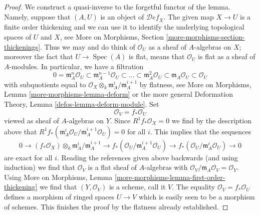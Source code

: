 \documentclass[10pt,a4paper]{amsart}
\theoremstyle{plain}
\theoremstyle{definition}
\theoremstyle{remark}
\numberwithin{equation}{subsection}
\def\Spec{\mathop{\mathrm{Spec}}}
\def\Deformationcategory{\mathcal{D}\!\mathit{ef}}
\begin{document}
\begin{proof}
We construct a quasi-inverse to the forgetful functor of the lemma.
Namely, suppose that $(A, U)$ is an object of $\Deformationcategory_X$.
The given map $X \to U$ is a finite order thickening and we can use
it to identify the underlying topological spaces of $U$ and $X$, see
More on Morphisms, Section \ref{more-morphisms-section-thickenings}.
Thus we may and do think of $\mathcal{O}_U$ as a sheaf of
$A$-algebras on $X$; moreover the fact that $U \to \Spec(A)$ is
flat, means that $\mathcal{O}_U$ is flat as a sheaf of $A$-modules.
In particular, we have a filtration
$$
0 = \mathfrak m_A^n\mathcal{O}_U \subset
\mathfrak m_A^{n - 1}\mathcal{O}_U \subset \ldots \subset
\mathfrak m_A^2\mathcal{O}_U \subset
\mathfrak m_A\mathcal{O}_U \subset \mathcal{O}_U
$$
with subquotients equal to
$\mathcal{O}_X \otimes_k \mathfrak m_A^i/\mathfrak m_A^{i + 1}$
by flatness, see More on Morphisms, Lemma \ref{more-morphisms-lemma-deform}
or the more general Deformation Theory, Lemma \ref{defos-lemma-deform-module}.
Set
$$
\mathcal{O}_V = f_*\mathcal{O}_U
$$
viewed as sheaf of $A$-algebras on $Y$. Since
$R^1f_*\mathcal{O}_X = 0$ we find by the description above that
$R^1f_*(\mathfrak m_A^i\mathcal{O}_U/\mathfrak m_A^{i + 1}\mathcal{O}_U) = 0$
for all $i$. This implies that the sequences
$$
0 \to
(f_*\mathcal{O}_X) \otimes_k \mathfrak m_A^i/\mathfrak m_A^{i + 1} \to
f_*(\mathcal{O}_U/\mathfrak m_A^{i + 1}\mathcal{O}_U) \to
f_*(\mathcal{O}_U/\mathfrak m_A^i\mathcal{O}_U) \to 0
$$
are exact for all $i$. Reading the references given above backwards
(and using induction) we find that $\mathcal{O}_V$ is a flat
sheaf of $A$-algebras with
$\mathcal{O}_V/\mathfrak m_A\mathcal{O}_V = \mathcal{O}_Y$.
Using More on Morphisms, Lemma
\ref{more-morphisms-lemma-first-order-thickening}
we find that $(Y, \mathcal{O}_V)$ is a scheme, call it $V$.
The equality $\mathcal{O}_V = f_*\mathcal{O}_U$ defines a
morphism of ringed spaces $U \to V$ which is easily seen to be
a morphism of schemes. This finishes the proof by the
flatness already established.
\end{proof}
\end{document}
